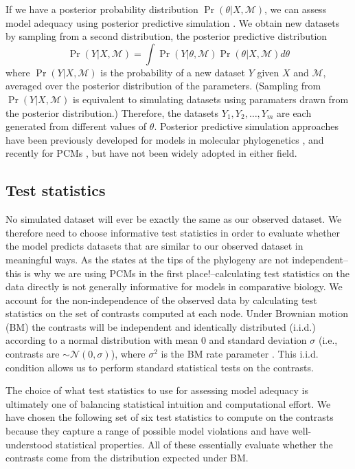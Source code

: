 If we have a posterior probability distribution $\Pr(\theta|X, \mathcal{M})$, we can assess model adequacy using posterior predictive simulation \citep{Rubin1984, Gelman1996}. We obtain new datasets by sampling from a second distribution, the posterior predictive distribution
\begin{equation}
\Pr(Y|X,\mathcal{M}) = \int \Pr(Y|\theta, \mathcal{M})\Pr(\theta |X,\mathcal{M})d\theta
\end{equation}
where $\Pr(Y|X,\mathcal{M})$ is the probability of a new dataset $Y$ given $X$ and $\mathcal{M}$, averaged over the posterior distribution of the parameters. (Sampling from $\Pr(Y|X,\mathcal{M})$ is equivalent to simulating datasets using paramaters drawn from the posterior distribution.) Therefore, the datasets $Y_1, Y_2, \ldots, Y_m$ are each generated from different values of $\theta$. Posterior predictive simulation approaches have been previously developed for models in molecular phylogenetics \citep{Bollback2002, Reid2013, Lewis2013, Brown2013}, and recently for PCMs \citep{SlaterPennell}, but have not been widely adopted in either field.

\subsection{Test statistics}
No simulated dataset will ever be exactly the same as our observed dataset. We therefore need to choose informative test statistics in order to evaluate whether the model predicts datasets that are similar to our observed dataset in meaningful ways. As the states at the tips of the phylogeny are not independent--this is why we are using PCMs in the first place!--calculating test statistics on the data directly is not generally informative for models in comparative biology. We account for the non-independence of the observed data by calculating test statistics on the set of contrasts \citep[i.e., ``phylogenetically independent contrasts'';][]{Felsenstein1985} computed at each node. \citep[We refer readers to][for details on how contrasts are calculated.]{Felsenstein1985, Rohlf2001, Blomberg2012} Under Brownian motion (BM) the contrasts will be independent and identically distributed (i.i.d.) according to a normal distribution with mean $0$ and standard deviation $\sigma$ (i.e., contrasts are $\sim \mathcal{N}(0, \sigma)$), where $\sigma^2$ is the BM rate parameter \citep{Felsenstein1985}. This i.i.d. condition allows us to perform standard statistical tests on the contrasts. 

The choice of what test statistics to use for assessing model adequacy is ultimately one of balancing statistical intuition and computational effort. We have chosen the following set of six test statistics to compute on the contrasts because they capture a range of possible model violations and have well-understood statistical properties. All of these essentially evaluate whether the contrasts come from the distribution expected under BM. 

